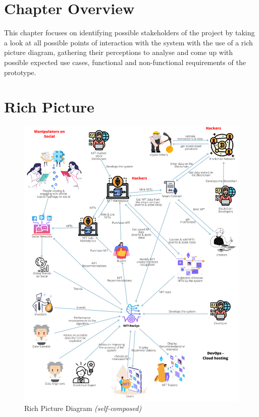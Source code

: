 \section{Chapter Overview}
This chapter focuses on identifying possible stakeholders of the project by taking a look at all possible points of interaction with the system with the use of a rich picture diagram, gathering their perceptions to analyse and come up with possible expected use cases, functional and non-functional requirements of the prototype. 

\section{Rich Picture}

\begin{figure}[h!]
\centering
\includegraphics[width=\textwidth]{images/SRS/rich-picture.png}
\caption{Rich Picture Diagram \textit{(self-composed)}}
\label{fig:rich-picture}
\end{figure}

